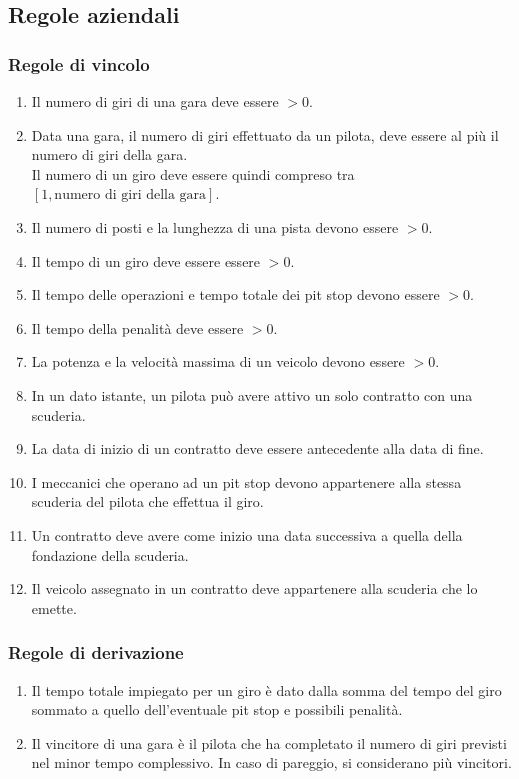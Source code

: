 \documentclass[11pt]{article}
\begin{document}
\subsection{Regole aziendali}
\subsubsection{Regole di vincolo}
\begin{enumerate}[label={RV \arabic*}, leftmargin=4em]
    \item Il numero di giri di una gara deve essere $>0$.
    \item Data una gara, il numero di giri effettuato da un pilota, deve essere al più il numero di giri della gara.\\
          Il numero di un giro deve essere quindi compreso tra $[1, \text{numero di giri della gara}]$.
    \item Il numero di posti e la lunghezza di una pista devono essere $>0$. 
    \item Il tempo di un giro deve essere essere $>0$. 
    \item Il tempo delle operazioni e tempo totale dei pit stop devono essere $>0$.
    \item Il tempo della penalità deve essere $>0$.
    \item La potenza e la velocità massima di un veicolo devono essere $>0$.
    \item In un dato istante, un pilota può avere attivo un solo contratto con una scuderia.
    \item La data di inizio di un contratto deve essere antecedente alla data di fine.
    \item I meccanici che operano ad un pit stop devono appartenere alla stessa scuderia del pilota che effettua il giro.
    \item Un contratto deve avere come inizio una data successiva a quella della fondazione della scuderia.
    \item Il veicolo assegnato in un contratto deve appartenere alla scuderia che lo emette.
\end{enumerate}

\subsubsection{Regole di derivazione}
\begin{enumerate}[label={RD \arabic*}, leftmargin=4em]
    \item Il tempo totale impiegato per un giro è dato dalla somma del tempo del giro sommato a quello dell'eventuale pit stop e possibili penalità.
    \item Il vincitore di una gara è il pilota che ha completato il numero di giri previsti nel minor tempo complessivo. In caso di pareggio, si considerano più vincitori.
\end{enumerate}
\end{document}
